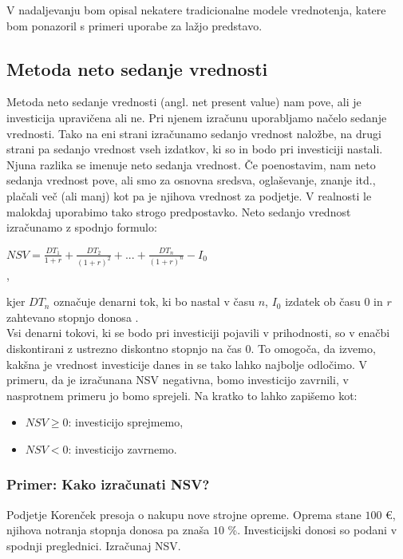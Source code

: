 V nadaljevanju  bom opisal nekatere tradicionalne modele vrednotenja, katere bom ponazoril s primeri uporabe za lažjo predstavo.

\subsection{Metoda neto sedanje vrednosti}
Metoda neto sedanje vrednosti (angl. net present value) nam pove, ali je investicija upravičena ali ne. Pri njenem izračunu uporabljamo načelo sedanje vrednosti. Tako na eni strani izračunamo sedanjo vrednost naložbe, na drugi strani pa sedanjo vrednost vseh izdatkov, ki so in bodo pri investiciji nastali. Njuna razlika se imenuje neto sedanja vrednost. Če poenostavim, nam neto sedanja vrednost pove, ali smo za osnovna sredsva, oglaševanje, znanje itd., plačali več (ali manj) kot pa je njihova vrednost za podjetje. V realnosti le malokdaj uporabimo tako strogo predpostavko. Neto sedanjo vrednost izračunamo z spodnjo formulo: \\

\begin{center}
$  NSV = \tfrac{DT_1}{1+r} + \tfrac{DT_2}{(1+r)^2} + ... + \tfrac{DT_n}{(1+r)^n} - I_0 $ \\,
\end{center}

kjer $DT_n$ označuje denarni tok, ki bo nastal v času $n$, $I_0$ izdatek ob času 0 in $r$ zahtevano stopnjo donosa \cite[str. 154]{Mramor}. \\

Vsi denarni tokovi, ki se bodo pri investiciji pojavili v prihodnosti, so v enačbi diskontirani z ustrezno diskontno stopnjo na čas 0. To omogoča, da izvemo, kakšna je vrednost investicije danes in se tako lahko najbolje  odločimo. V primeru, da je izračunana NSV negativna, bomo investicijo zavrnili, v nasprotnem primeru jo bomo sprejeli. Na kratko to lahko zapišemo kot:

\begin{itemize}
\item $NSV \geq 0$: investicijo sprejmemo,
\item $NSV<0$: investicijo zavrnemo.
\end{itemize}

\subsubsection{Primer: Kako izračunati NSV?}
Podjetje Korenček presoja o nakupu nove strojne opreme. Oprema stane $100$ €, njihova notranja stopnja donosa pa znaša $10$ \%. Investicijski donosi so podani v spodnji preglednici. Izračunaj NSV. \\

